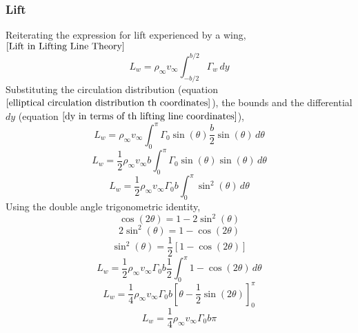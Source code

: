 \documentclass[a4paper, 12pt]{report}
\begin{document}
\begin{center}
\subsubsection{Lift}
\begin{comment}
\end{comment}
Reiterating the expression for lift experienced by a wing, $\ref{Lift in Lifting Line Theory}$
$$L_{w} = \rho_{\infty}v_{\infty}\int^{b/2}_{-b/2}\Gamma_{w}\,dy$$
Substituting the circulation distribution (equation $\ref{elliptical circulation distribution th coordinates}$), the bounds and the differential $dy$ (equation $\ref{dy in terms of th lifting line coordinates}$),
$$L_{w} = \rho_{\infty}v_{\infty}\int^{\pi}_{0} \Gamma_{0}\sin(\theta) \frac{b}{2}\sin(\theta)\,d\theta$$
$$L_{w} = \frac{1}{2}\rho_{\infty}v_{\infty}b \int^{\pi}_{0} \Gamma_{0}\sin(\theta) \sin(\theta)\,d\theta$$
$$L_{w} = \frac{1}{2}\rho_{\infty}v_{\infty}\Gamma_{0}b \int^{\pi}_{0} \sin^{2}(\theta) \,d\theta$$
Using the double angle trigonometric identity,
$$\cos(2\theta) = 1 - 2\sin^{2}(\theta)$$
$$2\sin^{2}(\theta) = 1 - \cos(2\theta)$$
$$\sin^{2}(\theta) = \frac{1}{2}\left[1 - \cos(2\theta)\right]$$
$$L_{w} = \frac{1}{2}\rho_{\infty}v_{\infty}\Gamma_{0}b \frac{1}{2}\int^{\pi}_{0}  1 - \cos(2\theta)  \,d\theta$$
$$L_{w} = \frac{1}{4}\rho_{\infty}v_{\infty}\Gamma_{0}b \left[\theta - \frac{1}{2}\sin(2\theta)\right]^{\pi}_{0} $$
\begin{equation}
L_{w} = \frac{1}{4}\rho_{\infty}v_{\infty}\Gamma_{0}b\pi
\label{Elliptical Distribution Lift Force}
\end{equation}
\begin{comment}
Using the definition for coefficient of lift,
$$C_{L} = \frac{L_{w}}{\displaystyle \frac{1}{2}\rho_{\infty}v_{\infty}^{2}A_{w}}$$
wherein $A_{w}$ represents the area of the wing. Manipulating the expression,
$$\frac{1}{2}\rho_{\infty}v_{\infty}^{2}A_{w} C_{L} = L_{w}$$
Equating the lift force produced by the wing to equation $\ref{Elliptical Distribution Lift Force}$,
$$\frac{1}{2}\rho_{\infty}v_{\infty}^{2}A_{w} C_{L} = L_{w} = \frac{1}{4}\rho_{\infty}v_{\infty}\Gamma_{0}b\pi$$
$$\frac{1}{2}v_{\infty}A_{w} C_{L} = \frac{1}{4}\Gamma_{0}b\pi$$
$$\frac{4}{2}v_{\infty}A_{w} C_{L} = \Gamma_{0}b\pi$$
$$2 v_{\infty}A_{w} C_{L} = \Gamma_{0}b\pi$$
$$\frac{2 v_{\infty}A_{w} C_{L}}{b\pi} = \Gamma_{0}$$
Susbtituting the constant $\Gamma_{0}$ out to equation $\ref{Elliptical Distribution Lift Force}$ to eliminate dependency on unknown factor $\Gamma_{0}$,
$$L_{w} = \frac{1}{4}\rho_{\infty}v_{\infty}b\pi\times \frac{2 v_{\infty}A_{w} C_{L}}{b\pi}$$
$$L_{w} = \frac{1}{4}\rho_{\infty}v_{\infty}\times \frac{2 v_{\infty}A_{w} C_{L}}{}$$
\end{comment}



\end{center}
\end{document}
